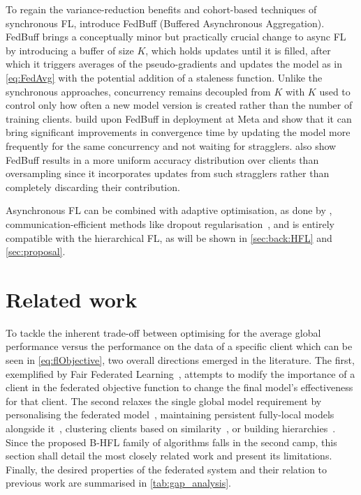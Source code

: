 To regain the variance-reduction benefits and cohort-based techniques of synchronous FL, \citet{FedBuff} introduce FedBuff (Buffered Asynchronous Aggregation). FedBuff brings a conceptually minor but practically crucial change to async FL by introducing a buffer of size $K$, which holds updates until it is filled, after which it triggers averages of the pseudo-gradients and updates the model as in \cref{eq:FedAvg} with the potential addition of a staleness function. Unlike the synchronous approaches, concurrency remains decoupled from $K$ with $K$ used to control only how often a new model version is created rather than the number of training clients. \citet{PAPAYA} build upon FedBuff in deployment at Meta and show that it can bring significant improvements in convergence time by updating the model more frequently for the same concurrency and not waiting for stragglers. \citet{PAPAYA} also show FedBuff results in a more uniform accuracy distribution over clients than oversampling since it incorporates updates from such stragglers rather than completely discarding their contribution.

Asynchronous FL can be combined with adaptive optimisation, as done by \citet{PAPAYA}, communication-efficient methods like dropout regularisation~\citep{AsyncDropout}, and is entirely compatible with the hierarchical FL, as will be shown in \cref{sec:back:HFL} and \cref{sec:proposal}.
\section{Related work}\label{sec:back:related_work}

To tackle the inherent trade-off between optimising for the average global performance versus the performance on the data of a specific client which can be seen in \cref{eq:flObjective}, two overall directions emerged in the literature. The first, exemplified by Fair Federated Learning~\citep{QFedAvg}, attempts to modify the importance of a client in the federated objective function to change the final model's effectiveness for that client. The second relaxes the single global model requirement by personalising the federated model~\citep{SalvagingFL,TowardsPersonalisedFL,FLwithNonIID}, maintaining persistent fully-local models alongside it~\citep{Ditto}, clustering clients based on similarity~\citep{ThreeApproachesMansour,AnEfficientFrameworkForClusteredFL}, or building hierarchies~\citep{Client-Edge-CloudHierFL,Hier_Het_Cellular}. Since the proposed B-HFL family of algorithms falls in the second camp, this section shall detail the most closely related work and present its limitations. Finally, the desired properties of the federated system and their relation to previous work are summarised in \cref{tab:gap_analysis}.



